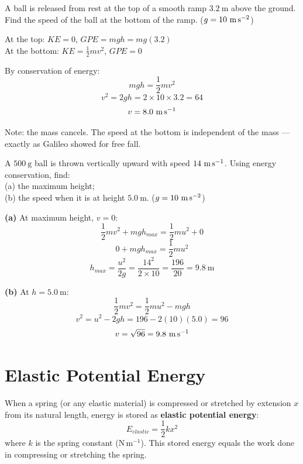 \begin{examplebox}[5.3]
A ball is released from rest at the top of a smooth
ramp $3.2\ \text{m}$ above the ground.
Find the speed of the ball at the bottom of the ramp.
($g = 10\ \text{m\,s}^{-2}$)
\end{examplebox}

\begin{solutionbox}
At the top: $KE = 0$, $GPE = mgh = mg(3.2)$\\
At the bottom: $KE = \frac{1}{2}mv^2$, $GPE = 0$

By conservation of energy:
\[
  mgh = \frac{1}{2}mv^2
\]
\[
  v^2 = 2gh = 2 \times 10 \times 3.2 = 64
\]
\[
  v = 8.0\ \text{m\,s}^{-1}
\]

Note: the mass cancels. The speed at the bottom is
independent of the mass --- exactly as Galileo showed
for free fall.
\end{solutionbox}

\begin{examplebox}[5.4]
A $500\ \text{g}$ ball is thrown vertically upward
with speed $14\ \text{m\,s}^{-1}$. Using energy
conservation, find:\\
(a) the maximum height;\\
(b) the speed when it is at height $5.0\ \text{m}$.
($g = 10\ \text{m\,s}^{-2}$)
\end{examplebox}

\begin{solutionbox}
\textbf{(a)} At maximum height, $v = 0$:
\[
  \frac{1}{2}mv^2 + mgh_{max}
  = \frac{1}{2}mu^2 + 0
\]
\[
  0 + mgh_{max} = \frac{1}{2}mu^2
\]
\[
  h_{max} = \frac{u^2}{2g}
  = \frac{14^2}{2 \times 10} = \frac{196}{20}
  = 9.8\ \text{m}
\]

\textbf{(b)} At $h = 5.0\ \text{m}$:
\[
  \frac{1}{2}mv^2 = \frac{1}{2}mu^2 - mgh
\]
\[
  v^2 = u^2 - 2gh = 196 - 2(10)(5.0) = 96
\]
\[
  v = \sqrt{96} = 9.8\ \text{m\,s}^{-1}
\]
\end{solutionbox}

\section{Elastic Potential Energy}

\begin{definitionbox}
When a spring (or any elastic material) is compressed
or stretched by extension $x$ from its natural length,
energy is stored as \textbf{elastic potential energy}:
\[
  E_{elastic} = \frac{1}{2}kx^2
\]
where $k$ is the spring constant (N\,m$^{-1}$).
This stored energy equals the work done in compressing
or stretching the spring.
\end{definitionbox}

